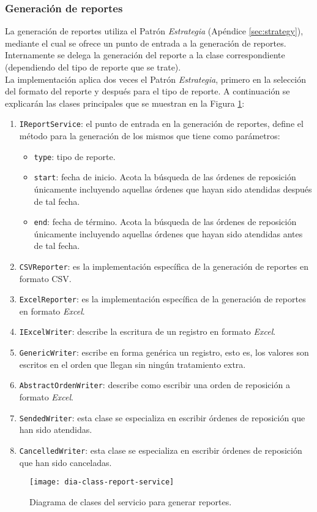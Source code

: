 \subsubsection{Generación de reportes}\label{sec:gen-repport}
La generación de reportes utiliza el Patrón \textit{Estrategia} (Apéndice \ref{sec:strategy}), mediante el cual se ofrece un punto de entrada a la generación de reportes. Internamente se delega la generación del reporte a la clase correspondiente (dependiendo del tipo de reporte que se trate).\\
La implementación aplica dos veces el Patrón \textit{Estrategia}, primero en la selección del formato del reporte y después para el tipo de reporte. A continuación se explicarán las clases principales que se muestran en la Figura \ref{fig:dia-class-report-service}:
\begin{enumerate}
	\item \texttt{IReportService}: el punto de entrada en la generación de reportes, define el método para la generación de los mismos que tiene como parámetros:
	\begin{itemize}
	 	\item \texttt{type}: tipo de reporte.
	 	\item \texttt{start}: fecha de inicio. Acota la búsqueda de las órdenes de reposición únicamente incluyendo aquellas órdenes que hayan sido atendidas después de tal fecha.
	 	\item \texttt{end}: fecha de término. Acota la búsqueda de las órdenes de reposición únicamente incluyendo aquellas órdenes que hayan sido atendidas antes de tal fecha.
	 \end{itemize}
	\item \texttt{CSVReporter}: es la implementación específica de la generación de reportes en formato CSV.
	\item \texttt{ExcelReporter}: es la implementación específica de la generación de reportes en formato \textit{Excel}\textsuperscript{\textcopyright}.
	\item \texttt{IExcelWriter}: describe la escritura de un registro en formato \textit{Excel}\textsuperscript{\textcopyright}.
	\item \texttt{GenericWriter}: escribe en forma genérica un registro, esto es, los valores son escritos en el orden que llegan sin ningún tratamiento extra. 
	\item \texttt{AbstractOrdenWriter}: describe como escribir una orden de reposición a formato \textit{Excel}\textsuperscript{\textcopyright}.
	\item \texttt{SendedWriter}: esta clase se especializa en escribir órdenes de reposición que han sido atendidas.
	\item \texttt{CancelledWriter}: esta clase se especializa en escribir órdenes de reposición que han sido canceladas.
\end{enumerate}
\begin{figure}[h]
	\centering
	\texttt{[image: dia-class-report-service]}
	\caption{Diagrama de clases del servicio para generar reportes.}
	\label{fig:dia-class-report-service}
\end{figure}
